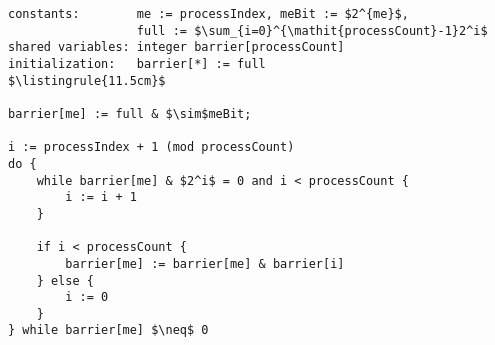 \begin{minipage}
\centering
\begin{lstlisting}[mathescape, linewidth=11.5cm]
constants:        me := processIndex, meBit := $2^{me}$,
                  full := $\sum_{i=0}^{\mathit{processCount}-1}2^i$
shared variables: integer barrier[processCount]
initialization:   barrier[*] := full
$\listingrule{11.5cm}$

barrier[me] := full & $\sim$meBit;

i := processIndex + 1 (mod processCount)
do {
	while barrier[me] & $2^i$ = 0 and i < processCount {
		i := i + 1
	}

	if i < processCount {
		barrier[me] := barrier[me] & barrier[i]
	} else {
		i := 0
	}
} while barrier[me] $\neq$ 0
\end{lstlisting}
\end{minipage}
